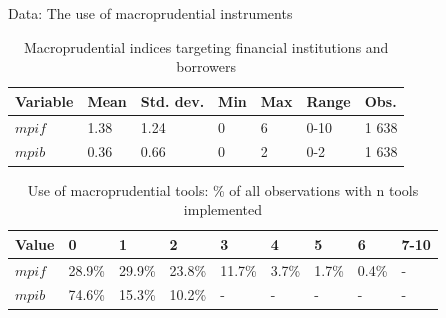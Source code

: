 \documentclass{beamer}
\begin{document}

\begin{frame}{Data: The use of macroprudential instruments}
\begin{table}[!h]
\centering
\begin{tabular}{ l l l l l l l }
\hline
Variable&Mean&Std. dev.&Min&Max&Range&Obs. \\
\hline
$mpif$&1.38&1.24&0&6&0-10&1 638 \\
$mpib$&0.36&0.66&0&2&0-2&1 638 \\
\hline
\end{tabular}
\caption{Macroprudential indices targeting financial institutions and borrowers}
\label{tab:mpi}
\end{table}

\begin{table}[!h]
\small
\centering
\begin{tabular}{ l l l l l l l l l }
\hline
Value&0&1&2&3&4&5&6&7-10\\
\hline
$mpif$&28.9\%&29.9\%&23.8\%&11.7\%&3.7\%&1.7\%&0.4\%&- \\
$mpib$&74.6\%&15.3\%&10.2\%&-&-&-&-&- \\
\hline
\end{tabular}
\caption{Use of macroprudential tools: \% of all observations with n tools implemented}
\label{tab:mpiu_use}
\end{table}
\end{frame}

\end{document}
